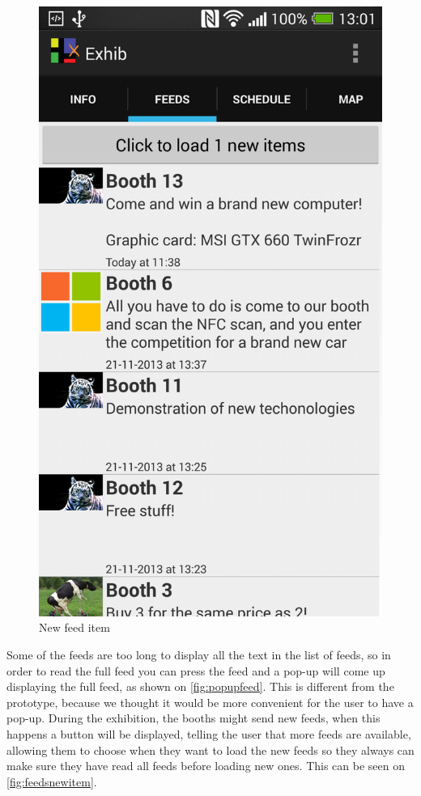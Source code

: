 \begin{figure}[H]
\begin{minipage}[b]{0.5\columnwidth}
\includegraphics[width=0.7\columnwidth]{img/finaldesign/feedsnewitem.png}
\caption{New feed item}
\label{fig:feedsnewitem}
\end{minipage}
\end{figure}

Some of the feeds are too long to display all the text in the list of feeds, so in order to read the full feed you can press the feed and a pop-up will come up displaying the full feed, as shown on \autoref{fig:popupfeed}. This is different from the prototype, because we thought it would be more convenient for the user to have a pop-up. During the exhibition, the booths might send new feeds, when this happens a button will be displayed, telling the user that more feeds are available, allowing them to choose when they want to load the new feeds so they always can make sure they have read all feeds before loading new ones. This can be seen on \autoref{fig:feedsnewitem}.

